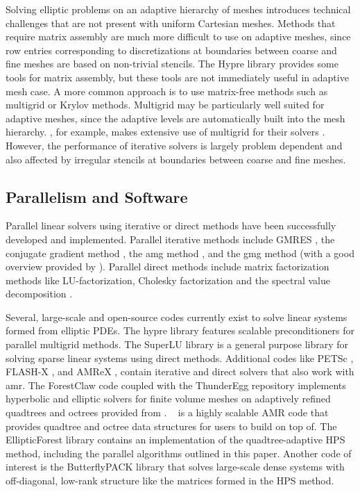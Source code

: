 Solving elliptic problems on an adaptive hierarchy of meshes introduces technical challenges that are not present with uniform Cartesian meshes. Methods that require matrix assembly are much more difficult to use on adaptive meshes, since row entries corresponding to discretizations at boundaries between coarse and fine meshes are based on non-trivial stencils.  The Hypre library \citep{falgout2002hypre} provides some tools for matrix assembly, but these tools are not immediately useful in adaptive mesh case. A more common approach is to use matrix-free methods such as multigrid or Krylov methods.  Multigrid may be particularly well suited for adaptive meshes, since the adaptive levels are automatically built into the mesh hierarchy. \amrex, for example, makes extensive use of multigrid for their solvers \citep{zhang2019amrex}.  However, the performance of iterative solvers is largely problem dependent and also affected by irregular stencils at boundaries between coarse and fine meshes.

\subsection{Parallelism and Software}

Parallel linear solvers using iterative or direct methods have been successfully developed and implemented. Parallel iterative methods include GMRES \citep{saad1986gmres}, the conjugate gradient method \citep{hestenes1952methods}, the \gls{amg} method \citep{yang2002boomeramg}, and the \gls{gmg} method \citep{sundar2012parallel} (with a good overview provided by \citet{chow2006survey}). Parallel direct methods include matrix factorization methods like LU-factorization, Cholesky factorization and the spectral value decomposition \citep{donfack2015survey, demmel1999asynchronous, gupta1997highly}.

Several, large-scale and open-source codes currently exist to solve linear systems formed from elliptic PDEs. The hypre library \citep{falgout2002hypre} features scalable preconditioners for parallel multigrid methods. The SuperLU library \citep{li2005superlu} is a general purpose library for solving sparse linear systems using direct methods. Additional codes like PETSc \citep{anl2023petsc}, FLASH-X \citep{dubey2022flash}, and AMReX \citep{zhang2019amrex}, contain iterative and direct solvers that also work with \gls{amr}. The ForestClaw code \citep{calhoun2017forestclaw} coupled with the ThunderEgg repository \citep{aiton2022thunderegg} implements hyperbolic and elliptic solvers for finite volume meshes on adaptively refined quadtrees and octrees provided from \pforest. \pforest\ \citep{burstedde2011p4est,burstedde2020parallel} is a highly scalable AMR code that provides quadtree and octree data structures for users to build on top of. The EllipticForest library \citep{chipman2024ellipticforest} contains an implementation of the quadtree-adaptive HPS method, including the parallel algorithms outlined in this paper. Another code of interest is the ButterflyPACK library \citep{liu2018butterflypack} that solves large-scale dense systems with off-diagonal, low-rank structure like the matrices formed in the HPS method.